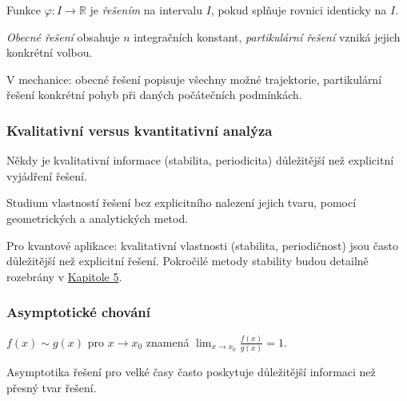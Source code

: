 \begin{definition}
Funkce $\varphi: I \to \mathbb{R}$ je \emph{řešením} na intervalu $I$, pokud splňuje rovnici identicky na $I$.
\end{definition}

\begin{definition}
\emph{Obecné řešení} obsahuje $n$ integračních konstant, \emph{partikulární řešení} vzniká jejich konkrétní volbou.
\end{definition}

\begin{example}
V mechanice: obecné řešení popisuje všechny možné trajektorie, partikulární řešení konkrétní pohyb při daných počátečních podmínkách.
\end{example}

\subsubsection{Kvalitativní versus kvantitativní analýza}

\begin{intuition}
Někdy je kvalitativní informace (stabilita, periodicita) důležitější než explicitní vyjádření řešení.
\end{intuition}

\begin{definition}
Studium vlastností řešení bez explicitního nalezení jejich tvaru, pomocí geometrických a analytických metod.
\end{definition}

\begin{keyinsight}
Pro kvantové aplikace: kvalitativní vlastnosti (stabilita, periodičnost) jsou často důležitější než explicitní řešení. Pokročilé metody stability budou detailně rozebrány v \hyperref[sec:teorie-stability]{Kapitole 5}.
\end{keyinsight}

\subsubsection{Asymptotické chování}

\begin{definition}
$f(x) \sim g(x)$ pro $x \to x_0$ znamená $\lim_{x \to x_0} \frac{f(x)}{g(x)} = 1$.
\end{definition}

\begin{intuition}
Asymptotika řešení pro velké časy často poskytuje důležitější informaci než přesný tvar řešení.
\end{intuition}

